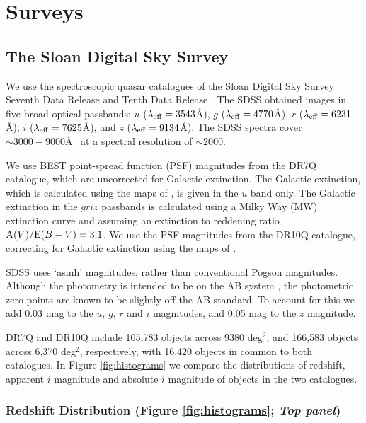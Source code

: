 \section{Surveys}

\subsection{The Sloan Digital Sky Survey}

We use the spectroscopic quasar catalogues of the Sloan Digital Sky Survey \citep[SDSS;][]{york00} Seventh Data Release \citep[DR7Q;][]{schneider10} and Tenth Data Release \citep[DR10Q;][]{paris14}. 
The SDSS obtained images in five broad optical passbands: $u$ ($\lambda_{\rm eff} = 3543$\AA), $g$ ($\lambda_{\rm eff} = 4770$\AA), $r$ ($\lambda_{\rm eff} = 6231$\AA), $i$ ($\lambda_{\rm eff} = 7625$\AA), and $z$ ($\lambda_{\rm eff} = 9134$\AA). 
The SDSS spectra cover $\sim 3000 - 9000$\AA~ at a spectral resolution of $\sim 2000$. 

We use BEST point-spread function (PSF) magnitudes from the DR7Q catalogue, which are uncorrected for Galactic extinction. 
The Galactic extinction, which is calculated using the maps of \citet{schlegel98}, is given in the $u$ band only. The Galactic extinction in the $griz$ passbands is calculated using a Milky Way (MW) extinction curve \citep{pei92} and assuming an extinction to reddening ratio ${\rm A}(V) / {\rm E}(B-V) = 3.1$. 
We use the PSF magnitudes from the DR10Q catalogue, correcting for Galactic extinction using the maps of \citet{schlafly11}. 

SDSS uses `asinh' magnitudes, rather than conventional Pogson magnitudes. 
Although the photometry is intended to be on the AB system \citet{oke83}, the photometric zero-points are known to be slightly off the AB standard. 
To account for this we add 0.03 mag to the $u$, $g$, $r$ and $i$ magnitudes, and 0.05 mag to the $z$ magnitude.

DR7Q and DR10Q include 105,783 objects across 9380 deg$^2$, and 166,583 objects across 6,370 deg$^2$, respectively, with 16,420 objects in common to both catalogues. 
In Figure \ref{fig:histograms} we compare the distributions of redshift, apparent $i$ magnitude and absolute $i$ magnitude of objects in the two catalogues. 

\subsubsection{Redshift Distribution (Figure \ref{fig:histograms}; {\it Top panel})}

